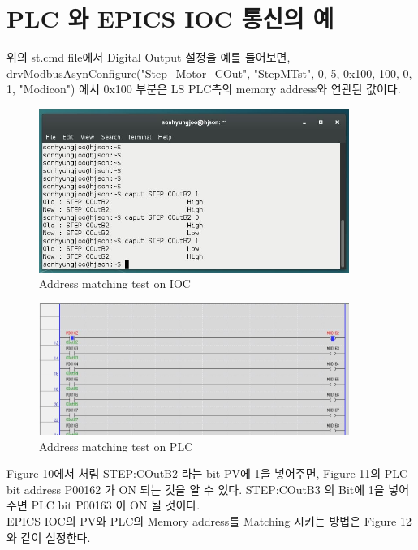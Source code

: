 \documentclass[11pt
  , a4paper
  , article
  , oneside
]{memoir}
\begin{document}
\section{PLC 와 EPICS IOC 통신의 예}

위의 st.cmd file에서 Digital Output 설정을 예를 들어보면, drvModbusAsynConfigure("Step\_Motor\_COut",  "StepMTst", 0, 5,  0x100,  100,    0,  1, "Modicon") 에서 0x100 부분은 LS PLC측의 memory address와 연관된 값이다. 

\begin{figure}[h]
	\centering
	\includegraphics[width=0.9\textwidth]{./picture/caput.JPG}
	\caption{
		Address matching test on IOC
	}
	\label{fig:}
\end{figure}

\begin{figure}[h]
	\centering
	\includegraphics[width=0.9\textwidth]{./picture/ladder_output.JPG}
	\caption{
		Address matching test on PLC
	}
	\label{fig:}
\end{figure}

Figure 10에서 처럼 STEP:COutB2 라는 bit PV에 1을 넣어주면, Figure 11의 PLC bit address P00162 가 ON 되는 것을 알 수 있다. STEP:COutB3 의 Bit에 1을 넣어주면 PLC bit P00163 이 ON 될 것이다. \\

EPICS IOC의 PV와 PLC의 Memory address를 Matching 시키는 방법은 Figure 12와 같이 설정한다.
\end{document}
